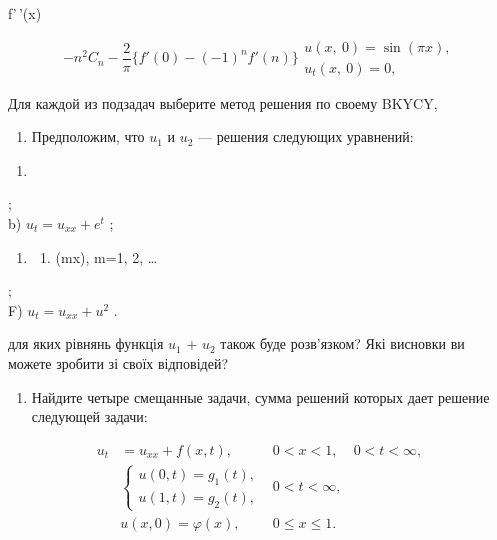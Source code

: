 \documentclass[
  ukrainian,
]{article}
\providecommand{\tightlist}{%
  \setlength{\itemsep}{0pt}\setlength{\parskip}{0pt}}
\begin{document}
f'\,'(x)

\[
-n^{2}C_{n} - \frac{2}{\pi} \{f'(0) - (-1)^{n} f'(n)\}
\begin{array}{ll} u\left(x, \ 0\right) = \sin{(\pi x)}, \\ u_{t}\left(x, \ 0\right) = 0, \end{array}
\]

Для каждой из подзадач выберите метод решения по своему BKYCY,

\begin{enumerate}
\def\labelenumi{\arabic{enumi}.}
\setcounter{enumi}{2}
\tightlist
\item
  Предположим, что \(u_1\) и \(u_2\) --- решения следующих уравнений:
\end{enumerate}

\begin{enumerate}
\def\labelenumi{\alph{enumi})}
\tightlist
\item
\end{enumerate}

;\\
b) \(u_t = u_{xx} + e^t\) ;

\begin{enumerate}
\def\labelenumi{\Alph{enumi})}
\setcounter{enumi}{1}
\tightlist
\item
  \begin{enumerate}
  \def\labelenumii{\arabic{enumii}.}
  \setcounter{enumii}{4}
  \tightlist
  \item
    \cos(mx), m=1, 2, \dots
  \end{enumerate}
\end{enumerate}

;\\
F) \(u_t = u_{xx} + u^2\) .

\mathbf{\Pi} для яких рівнянь функція \(u_1\) + \(u_2\) також буде
розв'язком? Які висновки ви можете зробити зі своїх відповідей?

\begin{enumerate}
\def\labelenumi{\arabic{enumi}.}
\setcounter{enumi}{3}
\tightlist
\item
  Найдите четыре смещанные задачи, сумма решений которых дает решение
  следующей задачи:
\end{enumerate}

\[
\begin{aligned} u_t &= u_{xx} + f(x, t), & 0 < x < 1, & 0 < t < \infty, \\ & \begin{cases} u(0, t) = g_1(t), \\ u(1, t) = g_2(t), \end{cases} & 0 < t < \infty, \\ & u(x, 0) = \varphi(x), & 0 \le x \le 1. \end{aligned}
\]
\end{document}
